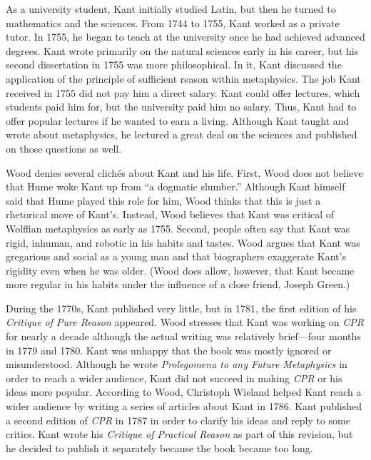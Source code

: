 \documentclass[12pt,letterpaper]{article}
\begin{document}
As a university student, Kant initially studied Latin, but then he turned to mathematics and the sciences.
From 1744 to 1755, Kant worked as a private tutor.
In 1755, he began to teach at the university once he had achieved advanced degrees.
Kant wrote primarily on the natural sciences early in his career, but his second dissertation in 1755 was more philosophical.
In it, Kant discussed the application of the principle of sufficient reason within metaphysics.
The job Kant received in 1755 did not pay him a direct salary.
Kant could offer lectures, which students paid him for, but the university paid him no salary.
Thus, Kant had to offer popular lectures if he wanted to earn a living.
Although Kant taught and wrote about metaphysics, he lectured a great deal on the sciences and published on those questions as well.

Wood denies several clichés about Kant and his life.
First, Wood does not believe that Hume woke Kant up from ``a dogmatic slumber.''
Although Kant himself said that Hume played this role for him, Wood thinks that this is just a rhetorical move of Kant's.
Instead, Wood believes that Kant was critical of Wolffian metaphysics as early as 1755.
Second, people often say that Kant was rigid, inhuman, and robotic in his habits and tastes.
Wood argues that Kant was gregarious and social as a young man and that biographers exaggerate Kant's rigidity even when he was older.
(Wood does allow, however, that Kant became more regular in his habits under the influence of a close friend, Joseph Green.)

During the 1770s, Kant published very little, but in 1781, the first edition of his \textit{Critique of Pure Reason} appeared.
Wood stresses that Kant was working on \textit{CPR} for nearly a decade although the actual writing was relatively brief---four months in 1779 and 1780.
Kant was unhappy that the book was mostly ignored or misunderstood.
Although he wrote \textit{Prolegomena to any Future Metaphysics} in order to reach a wider audience, Kant did not succeed in making \textit{CPR} or his ideas more popular.
According to Wood, Christoph Wieland helped Kant reach a wider audience by writing a series of articles about Kant in 1786.
Kant published a second edition of \textit{CPR} in 1787 in order to clarify his ideas and reply to some critics.
Kant wrote his \textit{Critique of Practical Reason} as part of this revision, but he decided to publish it separately because the book became too long.
\end{document}
